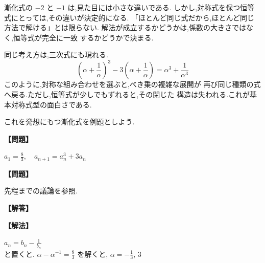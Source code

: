 漸化式の $-2$ と $-1$ は,見た目には小さな違いである.
しかし,対称式を保つ恒等式にとっては,その違いが決定的になる.
「ほとんど同じ式だから,ほとんど同じ方法で解ける」とは限らない.
解法が成立するかどうかは,係数の大きさではなく,恒等式が完全に一致
するかどうかで決まる.

同じ考え方は,三次式にも現れる.
\[
  \left(\alpha+\frac{1}{\alpha}\right)^3
  -3\left(\alpha+\frac{1}{\alpha}\right)
  =\alpha^3+\frac{1}{\alpha^3}
\]
このように,対称な組み合わせを選ぶと,べき乗の複雑な展開が
再び同じ種類の式へ戻る.ただし,恒等式が少しでもずれると,その閉じた
構造は失われる.これが基本対称式型の面白さである.

これを発想にもつ漸化式を例題としよう.

\noindent\textbf{【問題】}
\begin{smallquote}
  $\displaystyle a_1=\frac{8}{3},\quad a_{n+1}=a_n^3+3a_n$
\end{smallquote}
\noindent\textbf{【問題】}
\begin{smallquote}
  先程までの議論を参照.
\end{smallquote}
\noindent\textbf{【解答】}
\begin{smallquote}
  
\end{smallquote}
\noindent\textbf{【解法】}
\begin{smallquote}
  $a_n=b_n-\frac{1}{b_n}$\\
  と置くと.
  $\displaystyle \alpha-\alpha^{-1}=\frac{8}{3}$
  を解くと,
  $\displaystyle \alpha=-\frac{1}{3},\,3$

\end{smallquote}
